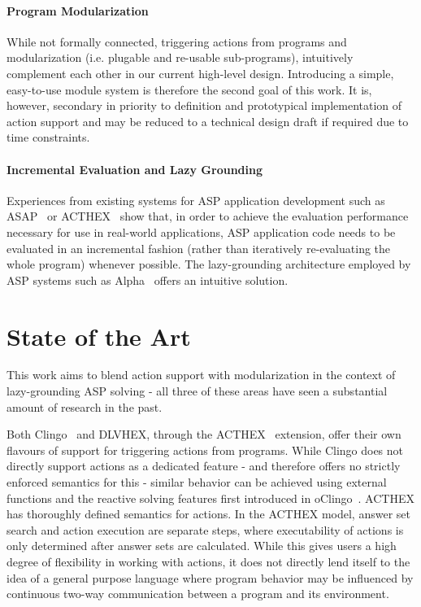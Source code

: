 \paragraph{Program Modularization} While not formally connected, triggering actions from programs and modularization (i.e. plugable and re-usable sub-programs), intuitively complement each other in our current high-level design. Introducing a simple, easy-to-use module system is therefore the second goal of this work. It is, however, secondary in priority to definition and prototypical implementation of action support and may be reduced to a technical design draft if required due to time constraints.

\paragraph{Incremental Evaluation and Lazy Grounding} Experiences from existing systems for ASP application development such as ASAP~\cite{aspetris} or ACTHEX~\cite{acthex} show that, in order to achieve the evaluation performance necessary for use in real-world applications, ASP application code needs to be evaluated in an incremental fashion (rather than iteratively re-evaluating the whole program) whenever possible. The lazy-grounding architecture employed by ASP systems such as Alpha~\cite{alpha} offers an intuitive solution.

\section{State of the Art}
This work aims to blend action support with modularization in the context of lazy-grounding ASP solving - all three of these areas have seen a substantial amount of research in the past.

Both Clingo~\cite{clingo4} and DLVHEX, through the ACTHEX~\cite{acthex} extension, offer their own flavours of support for triggering actions from programs. While Clingo does not directly support actions as a dedicated feature - and therefore offers no strictly enforced semantics for this - similar behavior can be achieved using external functions and the reactive solving features first introduced in oClingo~\cite{oclingo}. ACTHEX has thoroughly defined semantics for actions. In the ACTHEX model, answer set search and action execution are separate steps, where executability of actions is only determined after answer sets are calculated. While this gives users a high degree of flexibility in working with actions, it does not directly lend itself to the idea of a general purpose language where program behavior may be influenced by continuous two-way communication between a program and its environment.

